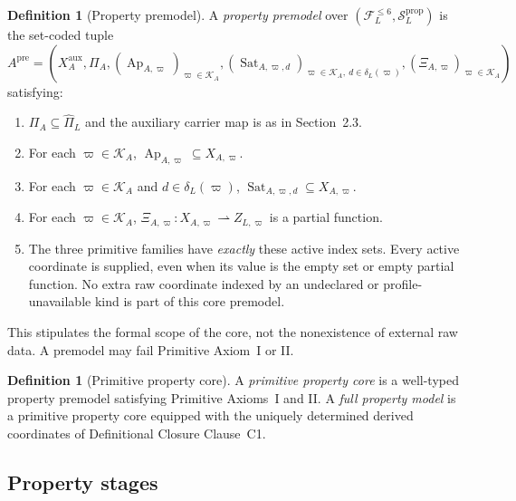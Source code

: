 \documentclass[11pt]{article}
\newcommand{\FVI}{\mathcal F_{L}^{\le 6}}
\newcommand{\Sprop}{\mathcal S_{L}^{\mathrm{prop}}}
\newcommand{\Pihat}{\widehat{\Pi}_{L}}
\newcommand{\Ap}{\operatorname{Ap}}
\newcommand{\Sat}{\operatorname{Sat}}
\theoremstyle{definition}
\newtheorem{definition}[theorem]{Definition}
\theoremstyle{remark}
\begin{document}
\begin{definition}[Property premodel]
\label{def:premodel}
A \emph{property premodel} over \((\FVI,\Sprop)\) is the set-coded tuple
\[
A^{\mathrm{pre}}=\left(
X_A^{\mathrm{aux}},\Pi_A,
(\Ap_{A,\varpi})_{\varpi\in\mathcal K_A},
(\Sat_{A,\varpi,d})_{
\varpi\in\mathcal K_A,\ d\in\delta_L(\varpi)},
(\Xi_{A,\varpi})_{\varpi\in\mathcal K_A}
\right)
\]
satisfying:
\begin{enumerate}[label=(\arabic*)]
\item \(\Pi_A\subseteq\Pihat\) and the auxiliary carrier map is
as in Section~2.3.
\item For each \(\varpi\in\mathcal K_A\),
\(\Ap_{A,\varpi}\subseteq X_{A,\varpi}\).
\item For each \(\varpi\in\mathcal K_A\) and
\(d\in\delta_L(\varpi)\),
\(\Sat_{A,\varpi,d}\subseteq X_{A,\varpi}\).
\item For each \(\varpi\in\mathcal K_A\),
\(\Xi_{A,\varpi}:X_{A,\varpi}\rightharpoonup Z_{L,\varpi}\)
is a partial function.
\item The three primitive families have \emph{exactly} these
active index sets. Every active coordinate is supplied, even
when its value is the empty set or empty partial function.
No extra raw coordinate indexed by an undeclared or
profile-unavailable kind is part of this core premodel.
\end{enumerate}
This stipulates the formal scope of the core, not the
nonexistence of external raw data.
A premodel may fail Primitive Axiom~I or II.
\end{definition}

\begin{definition}[Primitive property core]
A \emph{primitive property core} is a well-typed property premodel satisfying Primitive Axioms~I and II.
A \emph{full property model} is a primitive property core equipped with the uniquely determined derived coordinates of Definitional Closure Clause~C1.
\end{definition}

\subsection{Property stages}
\end{document}
